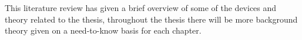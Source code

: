 This literature review has given a brief overview of some of the devices and theory related to the thesis, throughout the thesis there will be more background theory given on a need-to-know basis for each chapter.



